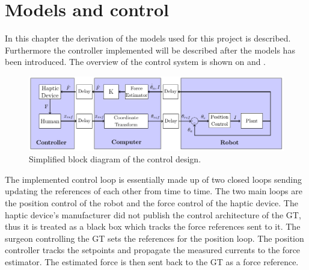 \chapter{Models and control}
In this chapter the derivation of the models used for this project is described. Furthermore the controller implemented will be described after the models has been introduced. The overview of the control system is shown on  and .
 
\begin{figure}[H]
	\includegraphics[width=\textwidth]{rapport/pictures/control.pdf} 
	\caption{Simplified block diagram of the control design.}
	\label{fig:simple_control}
\end{figure}

The implemented control loop is essentially made up of two closed loops sending updating the references of each other from time to time. The two main loops are the position control of the robot and the force control of the haptic device. The haptic device's manufacturer did not publish the control architecture of the GT, thus it is treated as a black box which tracks the force references sent to it. The surgeon controlling the GT sets the references for the position loop. The position controller tracks the setpoints and propagate the measured currents to the force estimator. The estimated force is then sent back to the GT as a force reference. 











